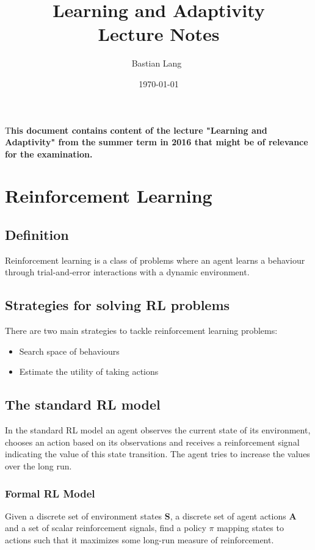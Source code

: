 \documentclass[	DIV=calc,%
				paper=a4,%
				fontsize=11pt,%
				twocolumn]{scrartcl}	 %
\title{Learning and Adaptivity
\\ Lecture Notes }%
\author{Bastian Lang~}	%
\date{\today}
\newcommand{\initial}[1]{%
     \lettrine[lines=3,lhang=0.3,nindent=0em]{
     				\color{brsublue}
     				{\textsf{#1}}}{}}
\begin{document}
\maketitle
\thispagestyle{fancy} %
\initial{T}\textbf{his document contains content of the lecture "Learning and Adaptivity" from the summer term in 2016 that might be of relevance for the examination.}

\section{Reinforcement Learning}
\subsection{Definition}
Reinforcement learning is a class of problems where an agent learns a behaviour through trial-and-error interactions with a dynamic environment.

\subsection{Strategies for solving RL problems}
There are two main strategies to tackle reinforcement learning problems:
\begin{itemize}
	\item Search space of behaviours
	\item Estimate the utility of taking actions
\end{itemize}

\subsection{The standard RL model}
In the standard RL model an agent observes the current state of its environment, chooses an action based on its observations and receives a reinforcement signal indicating the value of this state transition.
The agent tries to increase the values over the long run.

\subsubsection{Formal RL Model}
Given a discrete set of environment states \textbf{S}, a discrete set of agent actions \textbf{A} and a set of scalar reinforcement signals, find a policy \textbf{$\pi$} mapping states to actions such that it maximizes some long-run measure of reinforcement.
\end{document}
